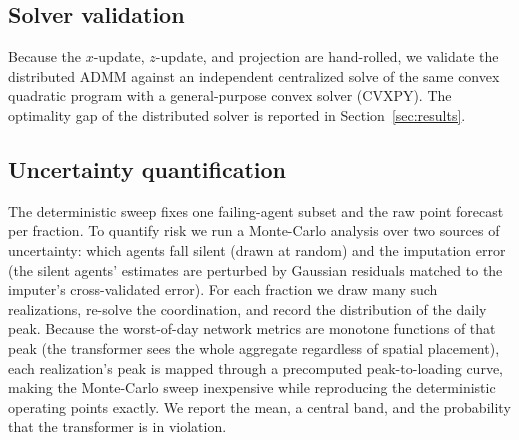 \subsection{Solver validation}
Because the $x$-update, $z$-update, and projection are hand-rolled, we validate
the distributed ADMM against an independent centralized solve of the same convex
quadratic program with a general-purpose convex solver (CVXPY). The optimality gap
of the distributed solver is reported in Section~\ref{sec:results}.

\subsection{Uncertainty quantification}
The deterministic sweep fixes one failing-agent subset and the raw point forecast
per fraction. To quantify risk we run a Monte-Carlo analysis over two sources of
uncertainty: which agents fall silent (drawn at random) and the imputation error
(the silent agents' estimates are perturbed by Gaussian residuals matched to the
imputer's cross-validated error). For each fraction we draw many such
realizations, re-solve the coordination, and record the distribution of the daily
peak. Because the worst-of-day network metrics are monotone functions of that
peak (the transformer sees the whole aggregate regardless of spatial placement),
each realization's peak is mapped through a precomputed peak-to-loading curve,
making the Monte-Carlo sweep inexpensive while reproducing the deterministic
operating points exactly. We report the mean, a central band, and the probability
that the transformer is in violation.
